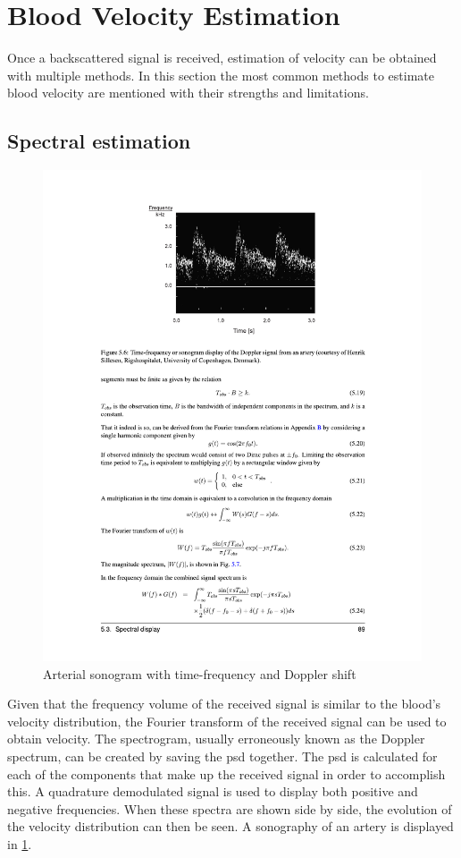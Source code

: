 \section{Blood Velocity Estimation}
Once a backscattered signal is received, estimation of velocity can be obtained with multiple methods. In this section the most common methods to estimate blood velocity are mentioned with their strengths and limitations. 
\subsection{Spectral estimation}
\begin{figure}[htbp]
	\centering
	\includegraphics[width=.8\textwidth]{Figures/2_estimation_sonogram_cph.pdf}
	\caption[Arterial sonogram with time-frequency and Doppler shift]{Arterial sonogram with time-frequency and Doppler shift \cite{JensenUltrasoundBook}}
	\label{fig:2_estimation_sonogram_cph}
\end{figure}

Given that the frequency volume of the received signal is similar to the blood's velocity distribution, the Fourier transform of the received signal can be used to obtain velocity. The spectrogram, usually erroneously known as the Doppler spectrum, can be created by saving the \gls{psd} together. The \gls{psd} is calculated for each of the components that make up the received signal in order to accomplish this. A quadrature demodulated signal is used to display both positive and negative frequencies. When these spectra are shown side by side, the evolution of the velocity distribution can then be seen. A sonography of an artery is displayed in \cref{fig:2_estimation_sonogram_cph}. 
